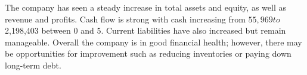

The company has seen a steady increase in total assets and equity, as well as revenue and profits. Cash flow is strong with cash increasing from $55,969 to $2,198,403 between 0 and 5. Current liabilities have also increased but remain manageable. Overall the company is in good financial health; however, there may be opportunities for improvement such as reducing inventories or paying down long-term debt.